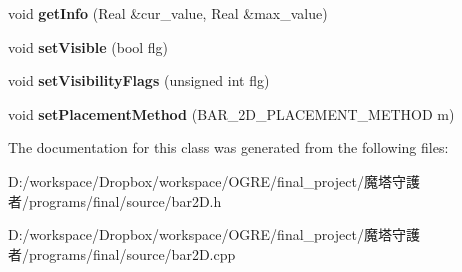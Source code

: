 \begin{DoxyCompactItemize}
\item 
\hypertarget{class_b_a_r__2_d_a45647a492e45fa0894e84065478c3586}{
void {\bfseries getInfo} (Real \&cur\_\-value, Real \&max\_\-value)}
\label{class_b_a_r__2_d_a45647a492e45fa0894e84065478c3586}

\item 
\hypertarget{class_b_a_r__2_d_a0fffd666f41a784c5811aae804167b89}{
void {\bfseries setVisible} (bool flg)}
\label{class_b_a_r__2_d_a0fffd666f41a784c5811aae804167b89}

\item 
\hypertarget{class_b_a_r__2_d_a0b756df3ebf1dd1a8c0e053820768555}{
void {\bfseries setVisibilityFlags} (unsigned int flg)}
\label{class_b_a_r__2_d_a0b756df3ebf1dd1a8c0e053820768555}

\item 
\hypertarget{class_b_a_r__2_d_a77da60e54529eed12d742576c27be91a}{
void {\bfseries setPlacementMethod} (BAR\_\-2D\_\-PLACEMENT\_\-METHOD m)}
\label{class_b_a_r__2_d_a77da60e54529eed12d742576c27be91a}

\end{DoxyCompactItemize}


The documentation for this class was generated from the following files:\begin{DoxyCompactItemize}
\item 
D:/workspace/Dropbox/workspace/OGRE/final\_\-project/魔塔守護者/programs/final/source/bar2D.h\item 
D:/workspace/Dropbox/workspace/OGRE/final\_\-project/魔塔守護者/programs/final/source/bar2D.cpp\end{DoxyCompactItemize}
